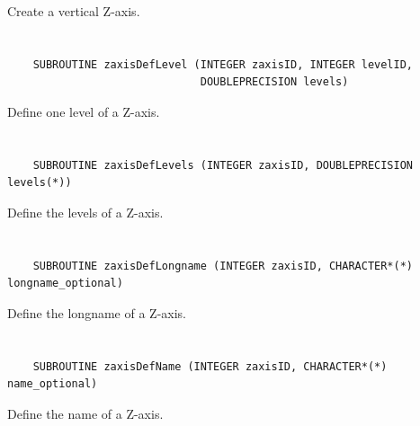 Create a vertical Z-axis.


\section*{\tt {}}

\begin{verbatim}
    SUBROUTINE zaxisDefLevel (INTEGER zaxisID, INTEGER levelID,
                              DOUBLEPRECISION levels)
\end{verbatim}

Define one level of a Z-axis.


\section*{\tt {}}

\begin{verbatim}
    SUBROUTINE zaxisDefLevels (INTEGER zaxisID, DOUBLEPRECISION levels(*))
\end{verbatim}

Define the levels of a Z-axis.


\section*{\tt {}}

\begin{verbatim}
    SUBROUTINE zaxisDefLongname (INTEGER zaxisID, CHARACTER*(*) longname_optional)
\end{verbatim}

Define the longname of a Z-axis.


\section*{\tt {}}

\begin{verbatim}
    SUBROUTINE zaxisDefName (INTEGER zaxisID, CHARACTER*(*) name_optional)
\end{verbatim}

Define the name of a Z-axis.


\section*{\tt {}}

